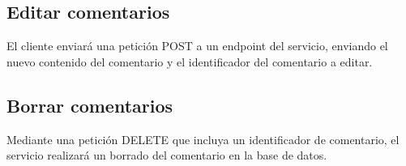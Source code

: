 \subsection{Editar comentarios}

El cliente enviará una petición POST a un endpoint del servicio, enviando el nuevo contenido del comentario y el identificador del comentario a editar.

\subsection{Borrar comentarios}

Mediante una petición DELETE que incluya un identificador de comentario, el servicio realizará un borrado del comentario en la base de datos.
